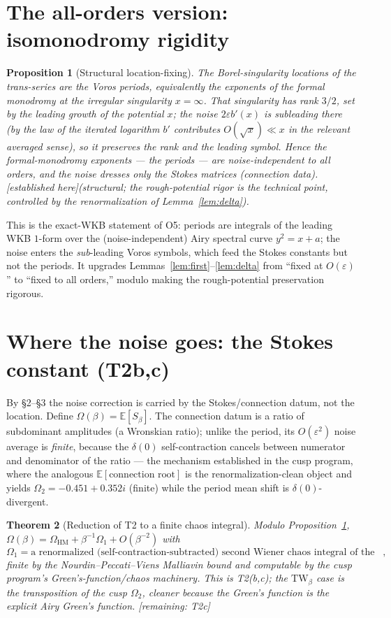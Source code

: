 \documentclass[11pt,reqno]{amsart}
\theoremstyle{plain}
\newtheorem{proposition}{Proposition}
\newtheorem{theorem}[proposition]{Theorem}
\theoremstyle{remark}
\newcommand{\E}{\mathbb{E}}
\newcommand{\eps}{\varepsilon}
\newcommand{\OK}{{\footnotesize\textsf{[established here]}}}
\newcommand{\gap}{{\footnotesize\textsf{[remaining: T2c]}}}
\begin{document}
\section{The all-orders version: isomonodromy rigidity}

\begin{proposition}[Structural location-fixing]\label{prop:rigid}
The Borel-singularity locations of the trans-series are the Voros periods, equivalently the
exponents of the formal monodromy at the irregular singularity $x=\infty$. That singularity has
rank $3/2$, set by the leading growth of the potential $x$; the noise $2\eps b'(x)$ is subleading
there (by the law of the iterated logarithm $b'$ contributes $O(\sqrt{x})\ll x$ in the relevant
averaged sense), so it preserves the rank and the leading symbol. Hence the formal-monodromy
exponents --- the periods --- are noise-independent to all orders, and the noise dresses only the
Stokes matrices (connection data). \OK\emph{(structural; the rough-potential rigor is the technical
point, controlled by the renormalization of Lemma~\ref{lem:delta}).}
\end{proposition}

This is the exact-WKB statement of O5: periods are integrals of the leading WKB $1$-form over the
(noise-independent) Airy spectral curve $y^2=x+a$; the noise enters the \emph{sub}-leading Voros
symbols, which feed the Stokes constants but not the periods. It upgrades
Lemmas~\ref{lem:first}--\ref{lem:delta} from ``fixed at $O(\eps)$'' to ``fixed to all orders,''
modulo making the rough-potential preservation rigorous.

\section{Where the noise goes: the Stokes constant (T2b,c)}

By \S2--\S3 the noise correction is carried by the Stokes/connection datum, not the location.
Define $\Omega(\beta)=\E[S_\beta]$. The connection datum is a ratio of subdominant amplitudes
(a Wronskian ratio); unlike the period, its $O(\eps^2)$ noise average is \emph{finite}, because the
$\delta(0)$ self-contraction cancels between numerator and denominator of the ratio --- the
mechanism established in the cusp program, where the analogous $\E[\text{connection root}]$ is the
renormalization-clean object and yields $\Omega_2=-0.451+0.352i$ (finite) while the period mean
shift is $\delta(0)$-divergent.

\begin{theorem}[Reduction of T2 to a finite chaos integral]\label{thm:reduce}
Modulo Proposition~\ref{prop:rigid}, $\Omega(\beta)=\Omega_{\mathrm{HM}}+\beta^{-1}\Omega_1+O(\beta^{-2})$
with
\[
\Omega_1=\text{a renormalized (self-contraction-subtracted) second Wiener chaos integral of the
Airy Green's function},
\]
finite by the Nourdin--Peccati--Viens Malliavin bound \cite{Viens} and computable by the cusp
program's Green's-function/chaos machinery. This is T2(b,c); the $\mathrm{TW}_\beta$ case is the
transposition of the cusp $\Omega_2$, cleaner because the Green's function is the explicit Airy
Green's function. \gap
\end{theorem}
\end{document}
